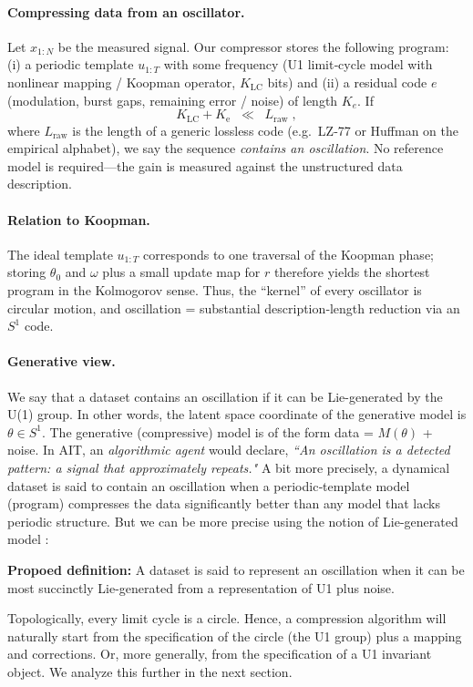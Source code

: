 \paragraph{Compressing data from an oscillator.} Let $x_{1:N}$ be the measured signal.  
Our compressor stores the following program: 
(i) a periodic template $u_{1:T}$ with some frequency (U1 limit‑cycle model with nonlinear mapping / Koopman operator, $K_{\text{LC}}$ bits) and  
(ii) a residual code $e$ (modulation, burst gaps,  remaining error / noise) of length $K_e$.  
If
\[
K_{\text{LC}} + K_{\text{e}} \;\; \ll \;\; L_{\text{raw}} \; ,
\]
where $L_{\text{raw}}$ is the length of a generic lossless code (e.g.\ LZ‑77 or Huffman on the empirical alphabet), we say the sequence \emph{contains an oscillation}.  
No reference model is required—the gain is measured against the unstructured data description.

\paragraph{Relation to Koopman.}
The ideal template $u_{1:T}$ corresponds to one traversal of the Koopman phase; storing $\theta_0$ and $\omega$ plus a small update map for $r$ therefore yields the shortest program in the Kolmogorov sense.  
Thus, the ``kernel'' of every oscillator is circular motion, and oscillation = substantial description‑length reduction via an $S^{1}$ code.

\paragraph{Generative view.} We say that a dataset contains an oscillation if it can be Lie-generated by the U(1) group. In other words, the latent space coordinate of the generative model is $\theta \in S^1$. The generative  (compressive) model is of the form data = $M(\theta)$ + noise.
 In AIT, an \textit{algorithmic agent} would declare, \textit{``An oscillation is a detected pattern: a signal that approximately repeats."}  A bit more precisely, a dynamical dataset is said to contain an oscillation when a periodic‑template model (program) compresses the data significantly better than any model that lacks periodic structure.  But we can be more precise using the notion of Lie-generated model \cite{ruffiniAITFoundationsStructured2022,ruffiniStructuredDynamicsAlgorithmic2023}: 


\begin{tcolorbox}[colback=gray!12,colframe=gray!12,enlarge left by=0mm,
  boxrule=0pt,sharp corners]
  \textbf{Propoed definition:}  A dataset is said to represent an oscillation when it can be most succinctly Lie-generated from a representation of U1 plus noise.
\end{tcolorbox}
 Topologically, every limit cycle is a circle. Hence, a compression algorithm will naturally start from the specification of the circle (the U1 group) plus a mapping and corrections. Or, more generally, from the specification of a U1 invariant object.  We analyze this further in the next section. 


